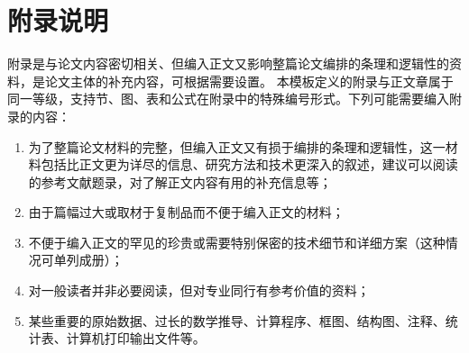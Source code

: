\appendix

\chapter{附录说明}

附录是与论文内容密切相关、但编入正文又影响整篇论文编排的条理和逻辑性的资料，是论文主体的补充内容，可根据需要设置。
本模板定义的附录与正文章属于同一等级，支持节、图、表和公式在附录中的特殊编号形式。下列可能需要编入附录的内容：

\begin{enumerate}[label=\arabic*、]
\item 为了整篇论文材料的完整，但编入正文又有损于编排的条理和逻辑性，这一材料包括比正文更为详尽的信息、研究方法和技术更深入的叙述，建议可以阅读的参考文献题录，对了解正文内容有用的补充信息等；
\item 由于篇幅过大或取材于复制品而不便于编入正文的材料；
\item 不便于编入正文的罕见的珍贵或需要特别保密的技术细节和详细方案（这种情况可单列成册）；
\item 对一般读者并非必要阅读，但对专业同行有参考价值的资料；
\item 某些重要的原始数据、过长的数学推导、计算程序、框图、结构图、注释、统计表、计算机打印输出文件等。
\end{enumerate}
